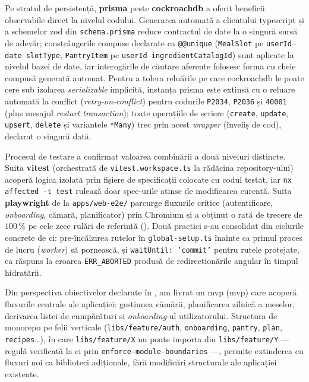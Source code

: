 Pe stratul de persistență, \textbf{\gls{prisma}} peste \textbf{\gls{cockroachdb}} a oferit beneficii observabile direct la nivelul codului.
Generarea automată a clientului \gls{typescript} și a schemelor \gls{zod} din \texttt{schema.prisma} reduce contractul de date la o singură sursă de adevăr; constrângerile compuse declarate ca \texttt{@@unique} (\texttt{MealSlot} pe \texttt{userId}--\texttt{date}--\texttt{slotType}, \texttt{PantryItem} pe \texttt{userId}--\texttt{ingredientCatalogId}) sunt aplicate la nivelul bazei de date, iar interogările de căutare aferente folosesc forma cu cheie compusă generată automat.
Pentru a tolera reluările pe care \gls{cockroachdb} le poate cere sub izolarea \textit{serializable} implicită, instanța \gls{prisma} este extinsă cu o reluare automată la conflict (\textit{retry-on-conflict}) pentru codurile \texttt{P2034}, \texttt{P2036} și \texttt{40001} (plus mesajul \textit{restart transaction}); toate operațiile de scriere (\texttt{create}, \texttt{update}, \texttt{upsert}, \texttt{delete} și variantele \texttt{*Many}) trec prin acest \textit{wrapper} (înveliș de cod), declarat o singură dată.

Procesul de testare a confirmat valoarea combinării a două niveluri distincte.
Suita \textbf{\gls{vitest}} (orchestrată de \texttt{vitest.workspace.ts} la rădăcina repository-ului) acoperă logica izolată prin fișiere de specificații colocate cu codul testat, iar \texttt{nx affected -t test} rulează doar spec-urile atinse de modificarea curentă.
Suita \textbf{\gls{playwright}} de la \texttt{apps/web-e2e/} parcurge fluxurile critice (autentificare, \textit{onboarding}, cămară, planificator) prin Chromium și a obținut o rată de trecere de \(100\,\%\) pe cele zece rulări de referință ().
Două practici s-au consolidat din ciclurile concrete de \acrshort{ci}: pre-încălzirea rutelor în \texttt{global-setup.ts} înainte ca primul proces de lucru (\textit{worker}) să pornească, și \texttt{waitUntil: 'commit'} pentru rutele protejate, ca răspuns la eroarea \texttt{ERR\_ABORTED} produsă de redirecționările \gls{angular} în timpul hidratării.

Din perspectiva obiectivelor declarate în , am livrat un \acrlong{mvp} (\acrshort{mvp}) care acoperă fluxurile centrale ale aplicației: gestiunea cămării, planificarea zilnică a meselor, derivarea listei de cumpărături și \textit{onboarding}-ul utilizatorului.
Structura de \gls{monorepo} pe felii verticale (\texttt{libs/feature/auth}, \texttt{onboarding}, \texttt{pantry}, \texttt{plan}, \texttt{recipes}\ldots), în care \texttt{libs/feature/X} nu poate importa din \texttt{libs/feature/Y} --- regulă verificată la \acrshort{ci} prin \texttt{enforce-module-boundaries} ---, permite extinderea cu fluxuri noi ca biblioteci adiționale, fără modificări structurale ale aplicației existente.

